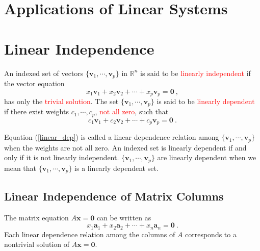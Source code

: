 \documentclass[12pt,a4paper]{article}
\renewcommand{\vec}[1]{\boldsymbol{#1}}
\begin{document}
\section{Applications of Linear Systems}













\section{Linear Independence}
\begin{tcolorbox}[colback=green!5,colframe=green!40!black,title= Definition]
An indexed set of vectors $\{\vec{v}_1, \cdots, \vec{v}_p\}$ in $\mathbb R^n$ is said to be \textcolor{red}{linearly independent} if the vector equation
\begin{equation}
x_1\vec{v}_1 +x_2\vec{v}_2 +\cdots +x_p\vec{v}_p = \vec{0} ~,
\end{equation}
has only the \textcolor{red}{trivial solution}. The set $\{\vec{v}_1, \cdots, \vec{v}_p\}$ is said to be \textcolor{red}{linearly dependent} if there exist weights $c_1, \cdots, c_p$, \textcolor{red}{not all zero}, such that
\begin{equation}
c_1\vec{v}_1 +c_2\vec{v}_2 +\cdots +c_p\vec{v}_p = \vec{0} ~.
\label{linear_dep}
\end{equation}
\end{tcolorbox}
Equation (\ref{linear_dep}) is called a linear dependence relation among $\{\vec{v}_1, \cdots, \vec{v}_p\}$ when the weights are not all zero. An indexed set is linearly dependent if and only if it is not linearly independent.  $\{\vec{v}_1, \cdots, \vec{v}_p\}$ are linearly dependent when we mean that $\{\vec{v}_1, \cdots, \vec{v}_p\}$ is a linearly dependent set.

\subsection{Linear Independence of Matrix Columns}
The matrix equation $A\vec{x} = \vec{0}$ can be written as
\begin{equation}
x_1\vec{a}_1 +x_2\vec{a}_2 + \cdots +x_n\vec{a}_n = \vec{0} ~.
\end{equation}
Each linear dependence relation among the columns of $A$ corresponds to a nontrivial solution of $A\vec{x} = \vec{0}$.
\end{document}
